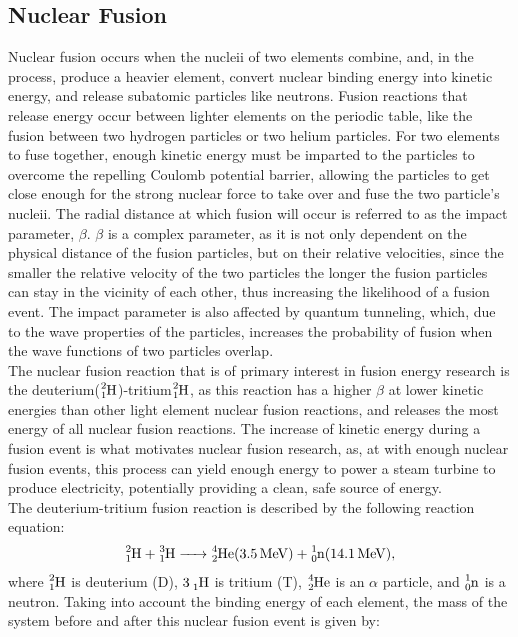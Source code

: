 \documentclass{article}
\begin{document}
\subsection{Nuclear Fusion}
Nuclear fusion occurs when the nucleii of two elements combine, and, in the process, produce a heavier element, convert nuclear binding energy into kinetic energy, and release subatomic particles like neutrons. Fusion reactions that release energy occur between lighter elements on the periodic table, like the fusion between two hydrogen particles or two helium particles.  For two elements to fuse together, enough kinetic energy must be imparted to the particles to overcome the repelling Coulomb potential barrier, allowing the particles to get close enough for the strong nuclear force to take over and fuse the two particle's nucleii. The radial distance at which fusion will occur is referred to as the impact parameter, $\beta$. \cite{jeffrey_p._friedberg_plasma_2007}$\beta$ is a complex parameter, as it is not only dependent on the physical distance of the fusion particles, but on their relative velocities, since the smaller the relative velocity of the two particles the longer the fusion particles can stay in the vicinity of each other, thus increasing the likelihood of a fusion event. The impact parameter is also affected by quantum tunneling, which, due to the wave properties of the particles, increases the probability of fusion when the wave functions of two particles overlap.\\
 The nuclear fusion reaction that is of primary interest in fusion energy research is the deuterium($\ce{^2_1H}$)-tritium$\ce{^2_1H}$, as this reaction has a higher $\beta$  at lower kinetic energies than other light element nuclear fusion reactions, and releases the most energy of all nuclear fusion reactions.  The increase of kinetic energy during a fusion event is what motivates nuclear fusion research, as, at with enough nuclear fusion events, this process can yield enough energy to power a steam turbine to produce electricity, potentially providing a clean, safe source of energy. \\
The deuterium-tritium fusion reaction is described by the following reaction equation:
\begin{align*}
\ce{^2_1H + ^3_1H ->	^4_2He(3.5 MeV) + ^1_0n(14.1 MeV)}, 
\end{align*}	
where $\ce{^2_1H}$ is deuterium (D), $\ce{3_1H}$ is tritium (T),  $\ce{^4_2He}$ is an $\alpha$ particle, and $\ce{^1_0n}$ is a neutron.
Taking into account the binding energy of each element, the mass of the system before and after this nuclear fusion event is given by:
\end{document}
